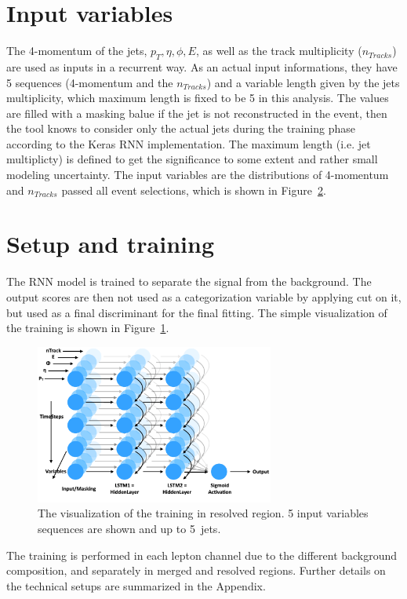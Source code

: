 \section{Input variables}
The 4-momentum of the jets, $p_T, \eta, \phi, E$, as well as the track multiplicity ($n_{Tracks}$) are used as inputs in a recurrent way. As an actual input informations, they have 5 sequences (4-momentum and the $n_{Tracks}$) and a variable length given by the jets multiplicity, which maximum length is fixed to be 5 in this analysis. The values are filled with a masking balue if the jet is not reconstructed in the event, then the tool knows to consider only the actual jets during the training phase according to the Keras RNN implementation. The maximum length (i.e. jet multiplicty) is defined to get the significance to some extent and rather small modeling uncertainty.
The input variables are the distributions of 4-momentum and $n_{Tracks}$ passed all event selections, which is shown in Figure~\ref{}.

\section{Setup and training}
The RNN model is trained to separate the signal from the background. The output scores are then not used as a categorization variable by applying cut on it, but used as a final discriminant for the final fitting.
The simple visualization of the training is shown in Figure~\ref{fig:simplenode}.
\begin{figure}[H]
    \centering
    \includegraphics[width=0.7\textwidth]{figures/simplenode}
    \caption{The visualization of the training in resolved region. 5 input variables sequences are shown and up to 5~jets.
    }
    \label{fig:simplenode}
\end{figure}

The training is performed in each lepton channel due to the different background composition, and separately in merged and resolved regions.
Further details on the technical setups are summarized in the Appendix.

